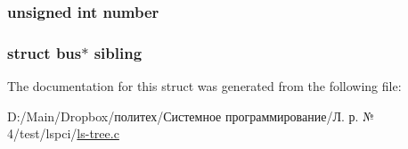 \subsubsection[{\texorpdfstring{number}{number}}]{\setlength{\rightskip}{0pt plus 5cm}unsigned int number}\hypertarget{structbus_ae8d56af1549c1276c20aae645c223ab1}{}\label{structbus_ae8d56af1549c1276c20aae645c223ab1}
\subsubsection[{\texorpdfstring{sibling}{sibling}}]{\setlength{\rightskip}{0pt plus 5cm}struct {\bf bus}$\ast$ sibling}\hypertarget{structbus_ab0b9175a10aa173a7cee05c0df6a18da}{}\label{structbus_ab0b9175a10aa173a7cee05c0df6a18da}


The documentation for this struct was generated from the following file\+:\begin{DoxyCompactItemize}
\item 
D\+:/\+Main/\+Dropbox/политех/Системное программирование/Л. р. № 4/test/lspci/\hyperlink{ls-tree_8c}{ls-\/tree.\+c}\end{DoxyCompactItemize}
